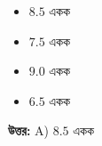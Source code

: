 \documentclass[12pt, a4paper]{article}
\begin{document}
\begin{itemize}[label={}, leftmargin=1cm, itemsep=0.5em]
    \item[\textbf{A)}] $8.5$ একক
    \item[\textbf{B)}] $7.5$ একক
    \item[\textbf{C)}] $9.0$ একক
    \item[\textbf{D)}] $6.5$ একক
\end{itemize}

\vspace{0.5em}
\begin{tcolorbox}[answerbox]
    \textbf{\color{success} উত্তর:} A) $8.5$ একক
\end{tcolorbox}
\vspace{1em}
\end{document}
